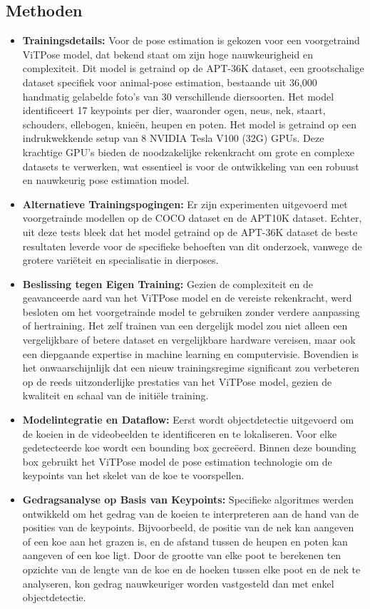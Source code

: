 \subsection{Methoden}
\begin{itemize}
  \item \textbf{Trainingsdetails:} Voor de pose estimation is gekozen voor een voorgetraind ViTPose model, dat bekend staat om zijn hoge nauwkeurigheid en complexiteit. Dit model is getraind op de APT-36K dataset, een grootschalige dataset specifiek voor animal-pose estimation, bestaande uit 36,000 handmatig gelabelde foto's van 30 verschillende diersoorten. Het model identificeert 17 keypoints per dier, waaronder ogen, neus, nek, staart, schouders, ellebogen, knieën, heupen en poten. Het model is getraind op een indrukwekkende setup van 8 NVIDIA Tesla V100 (32G) GPUs. Deze krachtige GPU's bieden de noodzakelijke rekenkracht om grote en complexe datasets te verwerken, wat essentieel is voor de ontwikkeling van een robuust en nauwkeurig pose estimation model.
  \item \textbf{Alternatieve Trainingspogingen:} Er zijn experimenten uitgevoerd met voorgetrainde modellen op de COCO dataset en de APT10K dataset. Echter, uit deze tests bleek dat het model getraind op de APT-36K dataset de beste resultaten leverde voor de specifieke behoeften van dit onderzoek, vanwege de grotere variëteit en specialisatie in dierposes.
  \item \textbf{Beslissing tegen Eigen Training:} Gezien de complexiteit en de geavanceerde aard van het ViTPose model en de vereiste rekenkracht, werd besloten om het voorgetrainde model te gebruiken zonder verdere aanpassing of hertraining. Het zelf trainen van een dergelijk model zou niet alleen een vergelijkbare of betere dataset en vergelijkbare hardware vereisen, maar ook een diepgaande expertise in machine learning en computervisie. Bovendien is het onwaarschijnlijk dat een nieuw trainingsregime significant zou verbeteren op de reeds uitzonderlijke prestaties van het ViTPose model, gezien de kwaliteit en schaal van de initiële training.
  \item \textbf{Modelintegratie en Dataflow:} Eerst wordt objectdetectie uitgevoerd om de koeien in de videobeelden te identificeren en te lokaliseren. Voor elke gedetecteerde koe wordt een bounding box gecreëerd. Binnen deze bounding box gebruikt het ViTPose model de pose estimation technologie om de keypoints van het skelet van de koe te voorspellen.
  \item \textbf{Gedragsanalyse op Basis van Keypoints:} Specifieke algoritmes werden ontwikkeld om het gedrag van de koeien te interpreteren aan de hand van de posities van de keypoints. Bijvoorbeeld, de positie van de nek kan aangeven of een koe aan het grazen is, en de afstand tussen de heupen en poten kan aangeven of een koe ligt. Door de grootte van elke poot te berekenen ten opzichte van de lengte van de koe en de hoeken tussen elke poot en de nek te analyseren, kon gedrag nauwkeuriger worden vastgesteld dan met enkel objectdetectie.
\end{itemize}

